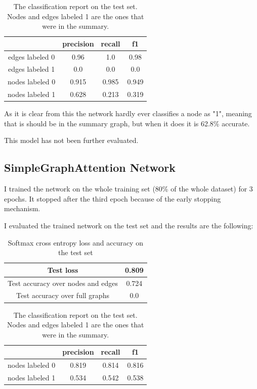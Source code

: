 \begin{table}[!h]
	\centering
	\begin{tabular}{| c | c | c | c |}
		\hline
		 & precision & recall & f1 \\ \hline \hline
		edges labeled 0&0.96&1.0&0.98  \\ \hline
		edges labeled 1 & 0.0 & 0.0 & 0.0 \\ \hline
		nodes labeled 0 & 0.915 & 0.985 & 0.949 \\ \hline
		nodes labeled 1 & 0.628 & 0.213 & 0.319 \\ \hline
	\end{tabular}
	\caption{The classification report on the test set. Nodes and edges labeled 1 are the ones that were in the summary.}
\end{table}

As it is clear from this the network hardly ever classifies a node as "1", meaning that is should be in the summary graph, but when it does it is 62.8\% accurate.

This model has not been further evaluated.

\subsection{SimpleGraphAttention Network}
I trained the network on the whole training set (80\% of the whole dataset) for 3 epochs. It stopped after the third epoch because of the early stopping mechanism.

I evaluated the trained network on the test set and the results are the following:

\begin{table}[!h]
	\centering
	\begin{tabular}{| c | c |}
		\hline
		Test loss & 0.809 \\ \hline
		Test accuracy over nodes and edges& 0.724 \\ \hline
		Test accuracy over full graphs & 0.0 \\ \hline
	\end{tabular}
	\caption{Softmax cross entropy loss and accuracy on the test set}
\end{table}

\begin{table}[!h]
	\centering
	\begin{tabular}{| c | c | c | c |}
		\hline
		& precision & recall & f1 \\ \hline \hline
		nodes labeled 0 & 0.819 & 0.814 & 0.816 \\ \hline
		nodes labeled 1 & 0.534 & 0.542 & 0.538 \\ \hline
	\end{tabular}
	\caption{The classification report on the test set. Nodes and edges labeled 1 are the ones that were in the summary.}
\end{table}

